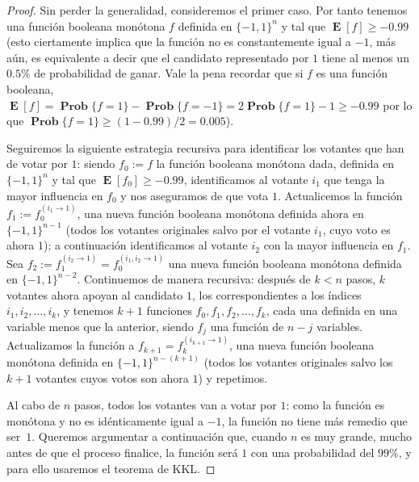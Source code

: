 \documentclass[autocontact]{gaceta}
\DeclareMathOperator{\EE}{\mathbf{E}}
\DeclareMathOperator{\Prob}{\mathbf{Prob}}
\begin{document}
\begin{proof}
Sin perder la generalidad, consideremos el primer caso. Por tanto tenemos una función booleana monótona $f$ definida en $\{-1,1\}^n$ y tal que $\EE[f] \geq -0.99$ (esto ciertamente implica que la función no es constantemente igual a $-1$, más aún, es equivalente a decir que el candidato representado por $1$ tiene al menos un $0.5\%$ de probabilidad de ganar. Vale la pena recordar que si $f$ es una función booleana, $\EE[f] = \Prob\{f=1\} - \Prob\{f=-1\} = 2 \Prob\{f=1\} - 1 \geq -0.99$ por lo que $\Prob\{f=1\}\geq (1-0.99)/2=0.005$).

Seguiremos la siguiente estrategia recursiva para identificar los votantes que han de votar por $1$: siendo $f_0:=f$ la función booleana monótona dada, definida en $\{-1,1\}^n$ y tal que $\EE[f_0]\geq -0.99$, identificamos al votante $i_1$ que tenga la mayor influencia en $f_0$ y nos aseguramos de que vota $1$. Actualicemos la función $f_1:=f_0^{(i_1\to 1)}$, una nueva función booleana monótona definida ahora en $\{-1,1\}^{n-1}$ (todos los votantes originales salvo por el votante $i_1$, cuyo voto es ahora $1$); a continuación identificamos al votante $i_2$ con la mayor influencia en $f_1$. Sea $f_2:=f_1^{(i_2\to1)}=f_0^{(i_1,i_2\to 1)}$ una nueva función booleana monótona definida en $\{-1,1\}^{n-2}$. Continuemos de manera recursiva: después de $k<n$ pasos, $k$ votantes ahora apoyan al candidato $1$, los correspondientes a los índices $i_1, i_2,\dots, i_k$, y tenemos $k+1$ funciones $f_0,f_1,f_2,\dots, f_k$, cada una definida en una variable menos que la anterior, siendo $f_j$ una función de $n-j$ variables. Actualizamos la función a $f_{k+1}=f_{k}^{(i_{k+1}\to 1)}$, una nueva función booleana monótona definida en $\{-1,1\}^{n-(k +1)}$ (todos los votantes originales salvo los $k+1$ votantes cuyos votos son ahora $1$) y repetimos.

Al cabo de $n$ pasos, todos los votantes van a votar por $1$: como la función es monótona y no es idénticamente igual a $-1$, la función no tiene más remedio que ser~$1$. Queremos argumentar a continuación que, cuando $n$ es muy grande, mucho antes de que el proceso finalice, la función será $1$ con una probabilidad del $99\%$, y para ello usaremos el teorema de KKL.


\end{proof}
\end{document}
